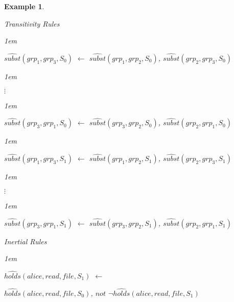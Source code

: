 \documentclass[11pt]{report}
\newtheorem{vexample}{Example}[chapter]
\newenvironment{vquote}
{
  \begin{list}{}{\leftmargin 1em}\item[]
}
{
  \end{list}
}
\begin{document}
\begin{vexample}
\begin{enumerate}
            \item
              Transitivity Rules

              \begin{vquote}
                $\hat{subst}(grp_1, grp_3, S_{0})$ $\leftarrow$
                $\hat{subst}(grp_1, grp_2, S_{0})$,
                $\hat{subst}(grp_2, grp_3, S_{0})$
              \end{vquote}

              \begin{vquote}
                \hspace{2em}$\vdots$
              \end{vquote}

              \begin{vquote}
                $\hat{subst}(grp_3, grp_1, S_{0})$ $\leftarrow$
                $\hat{subst}(grp_3, grp_2, S_{0})$,
                $\hat{subst}(grp_2, grp_1, S_{0})$
              \end{vquote}

              \begin{vquote}
                $\hat{subst}(grp_1, grp_3, S_{1})$ $\leftarrow$
                $\hat{subst}(grp_1, grp_2, S_{1})$,
                $\hat{subst}(grp_2, grp_3, S_{1})$
              \end{vquote}

              \begin{vquote}
                \hspace{2em}$\vdots$
              \end{vquote}

              \begin{vquote}
                $\hat{subst}(grp_3, grp_1, S_{1})$ $\leftarrow$
                $\hat{subst}(grp_3, grp_2, S_{1})$,
                $\hat{subst}(grp_2, grp_1, S_{1})$
              \end{vquote}

            \item
              Inertial Rules

              \begin{vquote}
                $\hat{holds}(alice, read, file, S_{1})$ $\leftarrow$

                \hspace{1em}
                $\hat{holds}(alice, read, file, S_{0})$,
                $not$ $\lnot\hat{holds}(alice, read, file, S_{1})$
              \end{vquote}


\end{enumerate}
\end{vexample}
\end{document}
